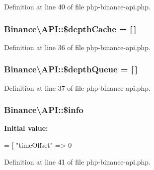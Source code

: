 Definition at line 40 of file php-\/binance-\/api.\-php.

\hypertarget{classBinance_1_1API_a69d62e886266a59b0a314cb4f5f164ca}{
\subsubsection[{\$depth\-Cache}]{\setlength{\rightskip}{0pt plus 5cm}Binance\textbackslash{}\-A\-P\-I\-::\$depth\-Cache = \mbox{[}$\,$\mbox{]}\hspace{0.3cm}{\ttfamily [protected]}}}\label{classBinance_1_1API_a69d62e886266a59b0a314cb4f5f164ca}


Definition at line 36 of file php-\/binance-\/api.\-php.

\hypertarget{classBinance_1_1API_ab04600479e07a4af0ead9ba84772bde1}{
\subsubsection[{\$depth\-Queue}]{\setlength{\rightskip}{0pt plus 5cm}Binance\textbackslash{}\-A\-P\-I\-::\$depth\-Queue = \mbox{[}$\,$\mbox{]}\hspace{0.3cm}{\ttfamily [protected]}}}\label{classBinance_1_1API_ab04600479e07a4af0ead9ba84772bde1}


Definition at line 37 of file php-\/binance-\/api.\-php.

\hypertarget{classBinance_1_1API_a8d15ac7cb74ac52f8f008e61aa7cab89}{
\subsubsection[{\$info}]{\setlength{\rightskip}{0pt plus 5cm}Binance\textbackslash{}\-A\-P\-I\-::\$info\hspace{0.3cm}{\ttfamily [protected]}}}\label{classBinance_1_1API_a8d15ac7cb74ac52f8f008e61aa7cab89}
{\bfseries Initial value\-:}
\begin{DoxyCode}
= [
        \textcolor{stringliteral}{"timeOffset"} => 0
\end{DoxyCode}


Definition at line 41 of file php-\/binance-\/api.\-php.

